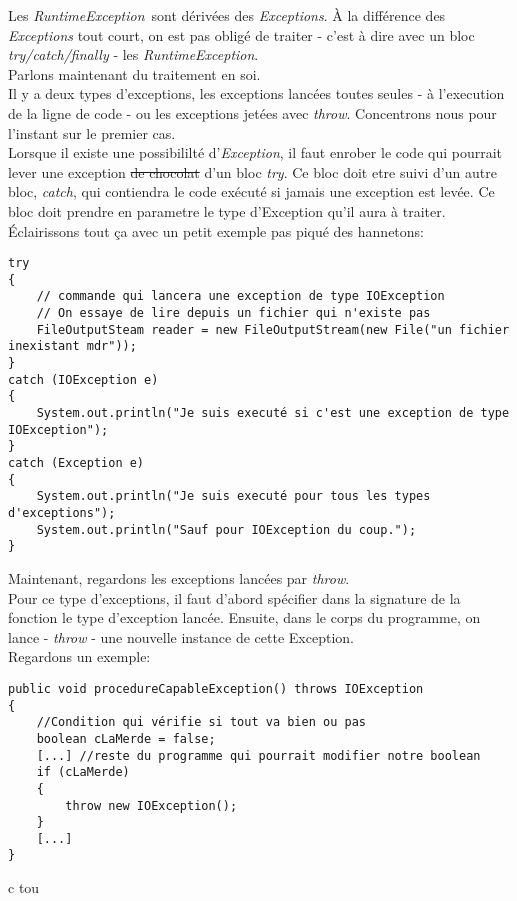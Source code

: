 \documentclass{article}
\begin{document}
Les \emph{RuntimeException} sont dérivées des \emph{Exceptions}. À la différence des \emph{Exceptions} tout court, on est pas obligé de traiter - c'est à dire avec un bloc \emph{try/catch/finally} - les \emph{RuntimeException}. \\
Parlons maintenant du traitement en soi.\\
Il y a deux types d'exceptions, les exceptions lancées toutes seules - à l'execution de la ligne de code - ou les exceptions jetées avec \emph{throw}. Concentrons nous pour l'instant sur le premier cas.\\
Lorsque il existe une possibililté d'\emph{Exception}, il faut enrober le code qui pourrait lever une exception \sout{de chocolat} d'un bloc \emph{try}. Ce bloc doit etre suivi d'un autre bloc, \emph{catch}, qui contiendra le code exécuté si jamais une exception est levée. Ce bloc doit prendre en parametre le type d'Exception qu'il aura à traiter. Éclairissons tout ça avec un petit exemple pas piqué des hannetons:
\begin{lstlisting}
try
{
	// commande qui lancera une exception de type IOException
	// On essaye de lire depuis un fichier qui n'existe pas
	FileOutputSteam reader = new FileOutputStream(new File("un fichier inexistant mdr"));
}
catch (IOException e)
{
	System.out.println("Je suis executé si c'est une exception de type IOException");
}
catch (Exception e)
{
	System.out.println("Je suis executé pour tous les types d'exceptions");
	System.out.println("Sauf pour IOException du coup.");
}
\end{lstlisting}
Maintenant, regardons les exceptions lancées par \emph{throw}. \\
Pour ce type d'exceptions, il faut d'abord spécifier dans la signature de la fonction le type d'exception lancée. Ensuite, dans le corps du programme, on lance - \emph{throw} - une nouvelle instance de cette Exception.\\
Regardons un exemple:
\begin{lstlisting}
public void procedureCapableException() throws IOException
{
	//Condition qui vérifie si tout va bien ou pas
	boolean cLaMerde = false;
	[...] //reste du programme qui pourrait modifier notre boolean
	if (cLaMerde)
	{
		throw new IOException();
	}
	[...]
}
\end{lstlisting}
c tou
\end{document}
